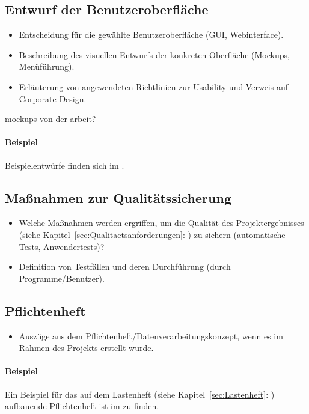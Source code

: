 \subsection{Entwurf der Benutzeroberfläche}
\label{sec:Benutzeroberflaeche} 

\begin{itemize}
	\item Entscheidung für die gewählte Benutzeroberfläche (\zB GUI, Webinterface).
	\item Beschreibung des visuellen Entwurfs der konkreten Oberfläche (\zB Mockups, Menüführung).
	\item \Ggfs Erläuterung von angewendeten Richtlinien zur Usability und Verweis auf Corporate Design.
\end{itemize}
\xx mockups von der arbeit?
\paragraph{Beispiel}
Beispielentwürfe finden sich im .


\subsection{Maßnahmen zur Qualitätssicherung}
\label{sec:Qualitaetssicherung}
\begin{itemize}
	\item Welche Maßnahmen werden ergriffen, um die Qualität des Projektergebnisses (siehe Kapitel~\ref{sec:Qualitaetsanforderungen}: ) zu sichern (\zB automatische Tests, Anwendertests)?
	\item \Ggfs Definition von Testfällen und deren Durchführung (durch Programme/Benutzer).
\end{itemize}


\subsection{Pflichtenheft}
\label{sec:Pflichtenheft}
\begin{itemize}
	\item Auszüge aus dem Pflichtenheft/Datenverarbeitungskonzept, wenn es im Rahmen des Projekts erstellt wurde.
\end{itemize}

\paragraph{Beispiel}
Ein Beispiel für das auf dem Lastenheft (siehe Kapitel~\ref{sec:Lastenheft}: ) aufbauende Pflichtenheft ist im  zu finden.



